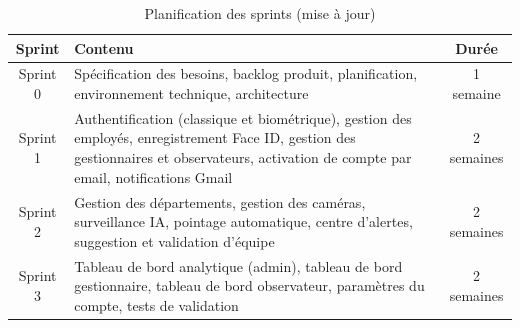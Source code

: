 %




\begin{table}[H]
  \centering
  \caption{Planification des sprints (mise à jour)}
  \label{tab:sprints_v2}
  \renewcommand{\arraystretch}{1.5}
  \begin{tabularx}{\textwidth}{|c|X|c|}
    \hline
    \rowcolor{gray!20}
    \textbf{Sprint} & \textbf{Contenu} & \textbf{Durée} \\
    \hline
    Sprint 0 & Spécification des besoins, backlog produit, planification, environnement technique, architecture & 1 semaine \\
    \hline
    Sprint 1 & Authentification (classique et biométrique), gestion des employés, enregistrement Face ID, gestion des gestionnaires et observateurs, activation de compte par email, notifications Gmail & 2 semaines \\
    \hline
    Sprint 2 & Gestion des départements, gestion des caméras, surveillance IA, pointage automatique, centre d'alertes, suggestion et validation d'équipe & 2 semaines \\
    \hline
    Sprint 3 & Tableau de bord analytique (admin), tableau de bord gestionnaire, tableau de bord observateur, paramètres du compte, tests de validation & 2 semaines \\
    \hline
  \end{tabularx}
\end{table}


